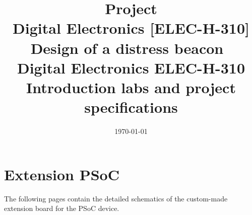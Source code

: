 \documentclass[10pt,a4paper]{article}
\date{\vspace{-1cm}\mydate\today}
\title{\vspace{-2cm} Project\\ Digital Electronics [ELEC-H-310]\\ Design of a distress beacon~\ifthenelse{\boolean{corrige}}{~\\Corrigé}{}}
\title{
Digital Electronics ELEC-H-310\\
Introduction labs and project specifications
}
\date{}
\theoremstyle{definition}%
\begin{document}
\maketitle
\tableofcontents


\newpage

\newpage

\newpage

\newpage

\appendix
\section{Extension PSoC}
The following pages contain the detailed schematics of the custom-made extension board for the PSoC device. 

\end{document}
